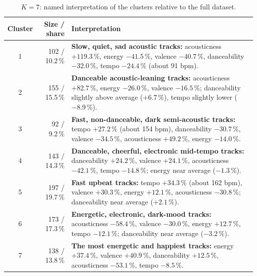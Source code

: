 \documentclass[11pt,letterpaper]{article}
\begin{document}
\begin{table}[H]
\centering
\caption{$K=7$: named interpretation of the clusters relative to the full
dataset.}
\label{tab:a3k7names}
\footnotesize
\begin{tabularx}{\textwidth}{@{}c r >{\raggedright\arraybackslash}X@{}}
\toprule
Cluster & Size / share & Interpretation \\
\midrule
1 & 102 / 10.2\,\% & \textbf{Slow, quiet, sad acoustic tracks:} acousticness
$+119.3\,\%$, energy $-41.5\,\%$, valence $-40.7\,\%$, danceability
$-32.0\,\%$, tempo $-24.4\,\%$ (about 91 bpm). \\
2 & 155 / 15.5\,\% & \textbf{Danceable acoustic-leaning tracks:} acousticness
$+82.7\,\%$, energy $-26.0\,\%$, valence $-16.5\,\%$; danceability slightly
above average ($+6.7\,\%$), tempo slightly lower ($-8.9\,\%$). \\
3 & 92 / 9.2\,\% & \textbf{Fast, non-danceable, dark semi-acoustic tracks:}
tempo $+27.2\,\%$ (about 154 bpm), danceability $-30.7\,\%$, valence
$-34.5\,\%$, acousticness $+49.2\,\%$, energy $-14.0\,\%$. \\
4 & 143 / 14.3\,\% & \textbf{Danceable, cheerful, electronic mid-tempo
tracks:} danceability $+24.2\,\%$, valence $+24.1\,\%$, acousticness
$-42.1\,\%$, tempo $-14.8\,\%$; energy near average ($-1.3\,\%$). \\
5 & 197 / 19.7\,\% & \textbf{Fast upbeat tracks:} tempo $+34.3\,\%$ (about
162 bpm), valence $+30.3\,\%$, energy $+12.1\,\%$, acousticness
$-30.8\,\%$; danceability near average ($+2.1\,\%$). \\
6 & 173 / 17.3\,\% & \textbf{Energetic, electronic, dark-mood tracks:}
acousticness $-58.4\,\%$, valence $-30.0\,\%$, energy $+12.7\,\%$, tempo
$-12.1\,\%$; danceability near average ($-3.2\,\%$). \\
7 & 138 / 13.8\,\% & \textbf{The most energetic and happiest tracks:} energy
$+37.4\,\%$, valence $+40.9\,\%$, danceability $+12.5\,\%$, acousticness
$-53.1\,\%$, tempo $-8.5\,\%$. \\
\bottomrule
\end{tabularx}
\end{table}
\end{document}
